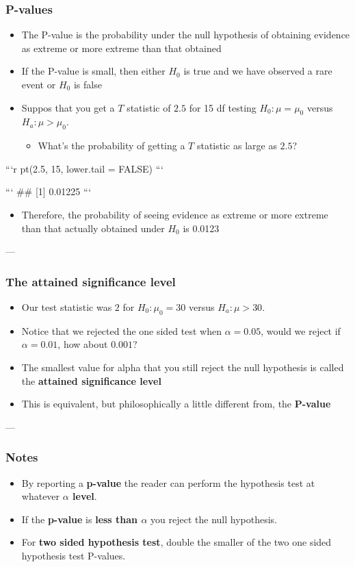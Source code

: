 \documentclass[10pt,article]{article}
\begin{document}
\subsubsection{P-values}
\label{sec:org4549f8e}
\begin{itemize}
\item The P-value is the probability under the null hypothesis of obtaining evidence as extreme or more extreme than that obtained
\item If the P-value is small, then either \(H_0\) is true and we have observed a rare event or \(H_0\) is false
\item Suppos that you get a \(T\) statistic of \(2.5\) for 15 df testing \(H_0:\mu = \mu_0\) versus \(H_a : \mu > \mu_0\).
\begin{itemize}
\item What's the probability of getting a \(T\) statistic as large as \(2.5\)?
\end{itemize}
\end{itemize}

```r
pt(2.5, 15, lower.tail = FALSE)
```

```
\#\# [1] 0.01225
```

\begin{itemize}
\item Therefore, the probability of seeing evidence as extreme or more extreme than that actually obtained under \(H_0\) is 0.0123
\end{itemize}

---
\subsubsection{The attained significance level}
\label{sec:org0dd49b8}
\begin{itemize}
\item Our test statistic was \(2\) for \(H_0 : \mu_0  = 30\) versus \(H_a:\mu > 30\).
\item Notice that we rejected the one sided test when \(\alpha = 0.05\), would we reject if \(\alpha = 0.01\), how about \(0.001\)?
\item The smallest value for alpha that you still reject the null hypothesis is called the \textbf{attained significance level}
\item This is equivalent, but philosophically a little different from, the \textbf{P-value}
\end{itemize}

---
\subsubsection{Notes}
\label{sec:org1ffa127}
\begin{itemize}
\item By reporting a \textbf{p-value} the reader can perform the hypothesis test at whatever \textbf{\(\alpha\) level}.
\item If the \textbf{p-value} is \textbf{less than \(\alpha\)} you {\color{green}reject the null hypothesis}.
\item For \textbf{two sided hypothesis test}, {\color{green}double the smaller of the two one sided hypothesis test P-values}.
\end{itemize}
\end{document}
